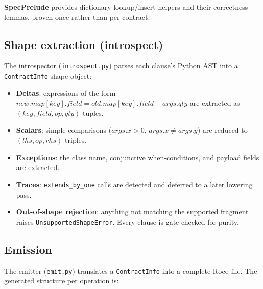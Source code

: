 \documentclass[11pt,a4paper]{article}
\begin{document}
\textbf{SpecPrelude} provides dictionary lookup/insert helpers and
their correctness lemmas, proven once rather than per contract.

\subsection{Shape extraction (introspect)}

The introspector (\texttt{introspect.py}) parses each clause's Python
AST into a \texttt{ContractInfo} shape object:

\begin{itemize}[nosep]
\item \textbf{Deltas}: expressions of the form
  $\mathit{new}.\mathit{map}[\mathit{key}].\mathit{field}
  = \mathit{old}.\mathit{map}[\mathit{key}].\mathit{field} \pm
  \mathit{args}.\mathit{qty}$ are extracted as
  $(\mathit{key}, \mathit{field}, op, \mathit{qty})$ tuples.
\item \textbf{Scalars}: simple comparisons ($\mathit{args}.x > 0$,
  $\mathit{args}.x \neq \mathit{args}.y$) are reduced to
  $(\mathit{lhs}, op, \mathit{rhs})$ triples.
\item \textbf{Exceptions}: the class name, conjunctive when-conditions,
  and payload fields are extracted.
\item \textbf{Traces}: \texttt{extends\_by\_one} calls are detected
  and deferred to a later lowering pass.
\item \textbf{Out-of-shape rejection}: anything not matching the
  supported fragment raises \texttt{UnsupportedShapeError}.  Every
  clause is gate-checked for purity.
\end{itemize}

\subsection{Emission}

The emitter (\texttt{emit.py}) translates a \texttt{ContractInfo} into
a complete Rocq file.  The generated structure per operation is:
\end{document}
